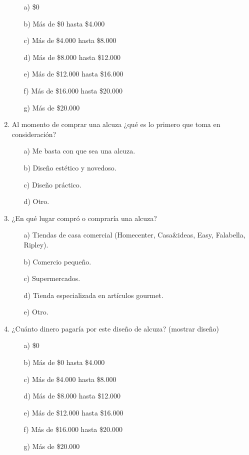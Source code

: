 \begin{enumerate}
\begin{itemize}
\item[a)] \$0
\item[b)]     Más de \$0 hasta \$4.000
\item[c)]        Más de \$4.000 hasta \$8.000
\item[d)]        Más de \$8.000 hasta \$12.000
\item[e)]        Más de \$12.000 hasta \$16.000
\item[f)]         Más de \$16.000 hasta \$20.000
\item[g)]         Más de \$20.000
\end{itemize}
\item Al momento de comprar una alcuza ¿qué es lo primero que toma en consideración?
\begin{itemize}
\item[a)] Me basta con que sea una alcuza.
\item[b)]     Diseño estético y novedoso.
\item[c)]        Diseño práctico.
\item[d)]        Otro.
\end{itemize}
\item ¿En qué lugar compró o compraría una alcuza?
\begin{itemize}
\item[a)] Tiendas de casa comercial (Homecenter, Casa\&ideas, Easy, Falabella, Ripley).
\item[b)]      Comercio pequeño.
\item[c)]        Supermercados.
\item[d)]        Tienda especializada en artículos gourmet.
\item[e)]        Otro.
\end{itemize}
\item ¿Cuánto dinero pagaría por este diseño de alcuza? (mostrar diseño)
\begin{itemize}
\item[a)] \$0
\item[b)]     Más de \$0 hasta \$4.000
\item[c)]        Más de \$4.000 hasta \$8.000
\item[d)]        Más de \$8.000 hasta \$12.000
\item[e)]        Más de \$12.000 hasta \$16.000
\item[f)]         Más de \$16.000 hasta \$20.000
\item[g)]         Más de \$20.000
\end{itemize}
\end{enumerate}
